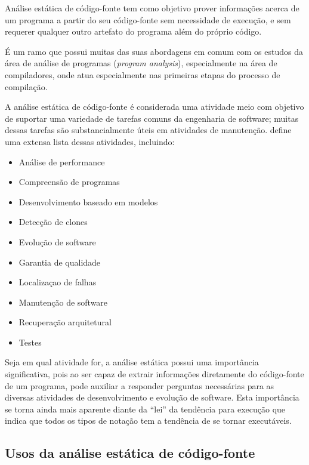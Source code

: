 Análise estática de código-fonte tem como objetivo prover
informações acerca de um programa a partir do seu código-fonte sem
necessidade de execução, e sem requerer qualquer outro artefato do programa
além do próprio código.

É um ramo que possui muitas das suas abordagens em comum com os estudos da
área de análise de programas ({\it program analysis}), especialmente na área de
compiladores, onde atua especialmente nas primeiras etapas do processo de compilação.

A análise estática de código-fonte é considerada uma atividade meio com
objetivo de suportar uma variedade de tarefas comuns da engenharia de
software; muitas dessas tarefas são substancialmente úteis em atividades de
manutenção.  define uma extensa lista dessas
atividades, incluindo:

\begin{multicols}{2}
  \begin{itemize}
    \item Análise de performance
    \item Compreensão de programas
    \item Desenvolvimento baseado em modelos
    \item Detecção de clones
    \item Evolução de software
    \item Garantia de qualidade
    \item Localizaçao de falhas
    \item Manutenção de software
    \item Recuperação arquitetural
    \item Testes
  \end{itemize}
\end{multicols}

Seja em qual atividade for, a análise estática possui uma importância
significativa, pois ao ser capaz de extrair informações diretamente do
código-fonte de um programa, pode auxiliar a responder perguntas necessárias
para as diversas atividades de desenvolvimento e evolução de software. Esta
importância se torna ainda mais aparente diante da ``lei'' da tendência para
execução \cite{Harman2010} que indica que todos os tipos de notação tem a
tendência de se tornar executáveis.

\subsection{Usos da análise estática de código-fonte} \label{usos}

